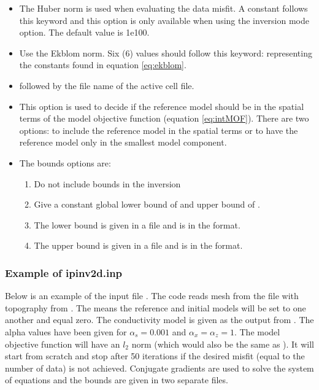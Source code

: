 \begin{itemize}
%
\item[\fileName{HUBER}] The Huber norm is used when evaluating the data misfit. A constant follows this keyword and this option is only available when using the  inversion mode option. The default value is 1e100. 
%
\item[\fileName{EKBLOM}] Use the Ekblom norm. Six (6) values should follow this keyword:  representing the constants found in equation \ref{eq:ekblom}.
%
\item[\fileName{ACTIVE\_CELLS}] followed by the file name of the active cell file.
%
\item[\fileName{USE\_MREF}] This option is used to decide if the reference model should be in the spatial terms of the model objective function (equation \ref{eq:intMOF}). There are two options:  to include the reference model in the spatial terms or  to have the reference model only in the smallest model component.
%
\item[\fileName{BOUNDS}] The bounds options are:
\begin{enumerate}
\item{} Do not include bounds in the inversion
\item{} Give a constant global lower bound of  and upper bound of .
\item{} The lower bound is given in a file  and is in the  format.
\item{} The upper bound is given in a file  and is in the  format.
\end{enumerate}
%
\end{itemize}

 
\subsubsection*{Example of ipinv2d.inp}
Below is an example of the input file \fileName{i[inv2d.inp}. The code reads mesh from the file  with topography from . The means the reference and initial models will be set to one another and equal zero. The conductivity model is given as the output from . The alpha values have been given for $\alpha_s=0.001$ and $\alpha_x = \alpha_z = 1$. The model objective function will have an $l_2$ norm (which would also be the same as ). It will start from scratch and stop after 50 iterations if the desired misfit (equal to the number of data) is not achieved. Conjugate gradients are used to solve the system of equations and the bounds are given in two separate files.

